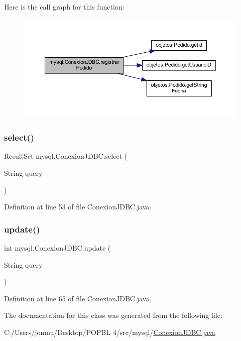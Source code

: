 Here is the call graph for this function\+:\nopagebreak
\begin{figure}[H]
\begin{center}
\leavevmode
\includegraphics[width=350pt]{classmysql_1_1_conexion_j_d_b_c_a6d8f0cd0e2046952d9771d379c16562a_cgraph}
\end{center}
\end{figure}
\mbox{\label{classmysql_1_1_conexion_j_d_b_c_a77f0c70a90a3e174114586b131f10909}} 
\subsubsection{\texorpdfstring{select()}{select()}}
{\footnotesize\ttfamily Result\+Set mysql.\+Conexion\+J\+D\+B\+C.\+select (\begin{DoxyParamCaption}\item[{String}]{query }\end{DoxyParamCaption})}



Definition at line 53 of file Conexion\+J\+D\+B\+C.\+java.

\mbox{\label{classmysql_1_1_conexion_j_d_b_c_a5a0abe91b83748401d0a630817c15e83}} 
\subsubsection{\texorpdfstring{update()}{update()}}
{\footnotesize\ttfamily int mysql.\+Conexion\+J\+D\+B\+C.\+update (\begin{DoxyParamCaption}\item[{String}]{query }\end{DoxyParamCaption})}



Definition at line 65 of file Conexion\+J\+D\+B\+C.\+java.



The documentation for this class was generated from the following file\+:\begin{DoxyCompactItemize}
\item 
C\+:/\+Users/jonmu/\+Desktop/\+P\+O\+P\+B\+L 4/src/mysql/\mbox{\hyperlink{_conexion_j_d_b_c_8java}{Conexion\+J\+D\+B\+C.\+java}}\end{DoxyCompactItemize}
